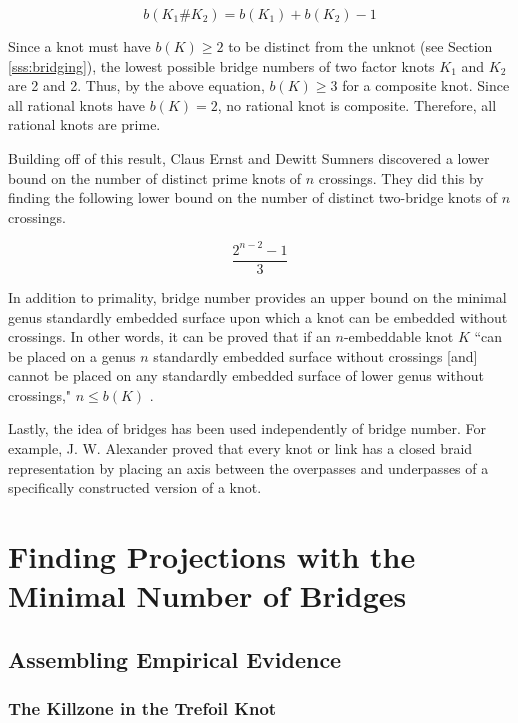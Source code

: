 \documentclass[titlepage,11pt]{article}
\newcommand{\dq}[4][]{``#2"#1 \cite[#4]{#3}.}
\begin{document}
\begin{equation*}
    b(K_1\#K_2) = b(K_1)+b(K_2)-1
\end{equation*}

Since a knot must have $b(K)\geq 2$ to be distinct from the unknot (see Section \ref{sss:bridging}), the lowest possible bridge numbers of two factor knots $K_1$ and $K_2$ are 2 and 2. Thus, by the above equation, $b(K)\geq 3$ for a composite knot. Since all rational knots have $b(K)=2$, no rational knot is composite. Therefore, all rational knots are prime.\par
Building off of this result, Claus Ernst and Dewitt Sumners discovered a lower bound on the number of distinct prime knots of $n$ crossings. They did this by finding the following lower bound on the number of distinct two-bridge knots of $n$ crossings.

\begin{equation*}
    \frac{2^{n-2}-1}{3}
\end{equation*}

In addition to primality, bridge number provides an upper bound on the minimal genus standardly embedded surface upon which a knot can be embedded without crossings. In other words, it can be proved that if an $n$-embeddable knot $K$ \dq[ $n\leq b(K)$]{can be placed on a genus $n$ standardly embedded surface without crossings [and] cannot be placed on any standardly embedded surface of lower genus without crossings,}{bib:knotbook}{114}\par
Lastly, the idea of bridges has been used independently of bridge number. For example, J. W. Alexander proved that every knot or link has a closed braid representation by placing an axis between the overpasses and underpasses of a specifically constructed version of a knot.
\newpage



\section{Finding Projections with the Minimal Number of Bridges}
\subsection{Assembling Empirical Evidence}\label{sss:evidence}
\subsubsection{The Killzone in the Trefoil Knot}
\end{document}
